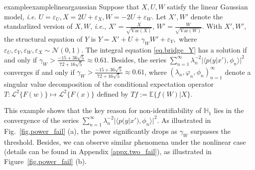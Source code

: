 \documentclass[
  12pt]{article}
\newtheorem{remark}{Remark}
\def\to{\rightarrow}
\def\mE{\mathbb{E}}
\def\mH{\mathbb{H}}
\def\cL{\mathcal{L}}
\def\cN{\mathcal{N}}
\def\mE{\mathbb{E}}
\begin{document}
\begin{restatable}{example}{examplelineargaussian}
\label{example:linear_gaussian_two_proxy}
Suppose that $X, U, W$ satisfy the linear Gaussian model, \emph{i.e.} $U=\varepsilon_U,X =2U + \varepsilon_X,W =-2U +\varepsilon_W$. Let $X', W'$ denote the standarlized version of $X, W$, \emph{i.e.}, $X' = \frac{X}{\sqrt{\mathrm{Var}(X)}}$, $W' = \frac{W}{\sqrt{\mathrm{Var}(W)}}$. With $X',W'$, the structural equation of $Y$ is $Y= X' + U+\gamma_W W'+\varepsilon_Y,$
where $\varepsilon_U,\varepsilon_Y,\varepsilon_W,\varepsilon_X \sim \cN(0,1)$. The integral equation \eqref{eq.bridge_Y} has a solution if and only if $\gamma_W>\frac{-15+36\sqrt{5}}{72+16\sqrt{5}}\approx0.61$. Besides, the series $\sum_{n=1}^\infty \lambda_n^{-2} |\langle p(y|x'),\phi_n \rangle|^2$ converges if and only if $\gamma_W>\frac{-15+36\sqrt{5}}{72+16\sqrt{5}}\approx0.61$, where $(\lambda_{n},\varphi_{n},\phi_{n})_{n=1}^{\infty}$ denote a singular value decomposition of the conditional expectation operator $T: \cL^2\{F(w)\} \mapsto \cL^2\{F(x)\}$ defined by $Tf := \mE\{f(W)| X \}$. 
\end{restatable}
This example shows that the key reason for non-identifiability of $\mH_1$ lies in the convergence of the series $\sum_{n=1}^\infty \lambda_n^{-2} |\langle p(y|x'),\phi_n \rangle|^2$. As illustrated in Fig.~\ref{fig.power_fail} (a), the power significantly drops as $\gamma_W$ surpasses the threshold. Besides, we can observe similar phenomena under the nonlinear case (details can be found in Appendix \ref{appx.two_fail}), as illustrated in Figure~\ref{fig.power_fail} (b). 

\end{document}
